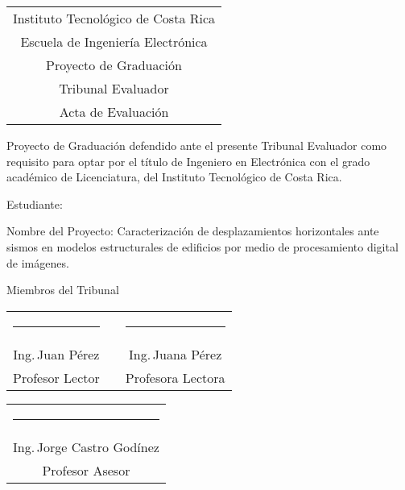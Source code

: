 \thispagestyle{empty}


\begin{center}
  \begin{tabular}{c}
    Instituto Tecnológico de Costa Rica \\
    Escuela de Ingeniería Electrónica \\
    Proyecto de Graduación \\
    Tribunal Evaluador \\
    Acta de Evaluación
  \end{tabular}
\end{center}

\vfill

Proyecto de Graduación defendido ante el presente Tribunal Evaluador como 
requisito para optar por el título de Ingeniero en Electrónica con el grado 
académico de Licenciatura, del Instituto Tecnológico de Costa Rica.  

\vfill

\begin{center}
  Estudiante: \scriptAuthor \par

  \vfill

  Nombre del Proyecto: Caracterización de desplazamientos horizontales ante
  sismos en modelos estructurales de edificios por medio de procesamiento
  digital de imágenes.\par
  
\end{center}

\vspace*{20mm}
\begin{center}
 Miembros del Tribunal
\end{center}
\vspace*{8mm}

\vfill

\begin{center}
  \begin{tabular}{ccc}
    \rule{70mm}{0.5pt} & \rule{15mm}{0pt} & \rule{70mm}{0.5pt} \\
    Ing.\,Juan Pérez && Ing.\,Juana Pérez \\
    Profesor Lector && Profesora Lectora
  \end{tabular}
  
  \vspace{10mm}

  \begin{tabular}{c}
    \rule{6cm}{0.5pt} \\
    Ing.\,Jorge Castro Godínez	\\
    Profesor Asesor
  \end{tabular}
\end{center}

